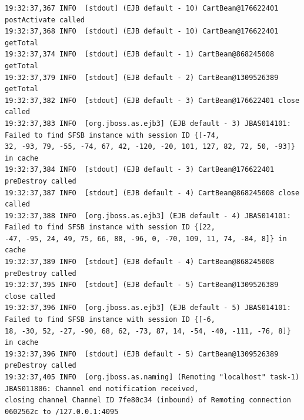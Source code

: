 \documentclass[a4paper,10pt]{scrreprt}
\begin{document}
\begin{enumerate}
\begin{lstlisting}[language={}]
19:32:37,367 INFO  [stdout] (EJB default - 10) CartBean@176622401 postActivate called
19:32:37,368 INFO  [stdout] (EJB default - 10) CartBean@176622401 getTotal
19:32:37,374 INFO  [stdout] (EJB default - 1) CartBean@868245008 getTotal
19:32:37,379 INFO  [stdout] (EJB default - 2) CartBean@1309526389 getTotal
19:32:37,382 INFO  [stdout] (EJB default - 3) CartBean@176622401 close called
19:32:37,383 INFO  [org.jboss.as.ejb3] (EJB default - 3) JBAS014101: Failed to find SFSB instance with session ID {[-74, 
32, -93, 79, -55, -74, 67, 42, -120, -20, 101, 127, 82, 72, 50, -93]} in cache
19:32:37,384 INFO  [stdout] (EJB default - 3) CartBean@176622401 preDestroy called
19:32:37,387 INFO  [stdout] (EJB default - 4) CartBean@868245008 close called
19:32:37,388 INFO  [org.jboss.as.ejb3] (EJB default - 4) JBAS014101: Failed to find SFSB instance with session ID {[22, 
-47, -95, 24, 49, 75, 66, 88, -96, 0, -70, 109, 11, 74, -84, 8]} in cache
19:32:37,389 INFO  [stdout] (EJB default - 4) CartBean@868245008 preDestroy called
19:32:37,395 INFO  [stdout] (EJB default - 5) CartBean@1309526389 close called
19:32:37,396 INFO  [org.jboss.as.ejb3] (EJB default - 5) JBAS014101: Failed to find SFSB instance with session ID {[-6, 
18, -30, 52, -27, -90, 68, 62, -73, 87, 14, -54, -40, -111, -76, 8]} in cache
19:32:37,396 INFO  [stdout] (EJB default - 5) CartBean@1309526389 preDestroy called
19:32:37,405 INFO  [org.jboss.as.naming] (Remoting "localhost" task-1) JBAS011806: Channel end notification received, 
closing channel Channel ID 7fe80c34 (inbound) of Remoting connection 0602562c to /127.0.0.1:4095
\end{lstlisting}

\end{enumerate}
\end{document}
